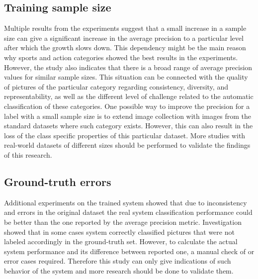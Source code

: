 \subsection{Training sample size}
Multiple results from the experiments suggest that a small increase in a sample size can give a significant increase in the average precision to a particular level after which the growth slows down. This dependency might be the main reason why sports and action categories showed the best results in the experiments. However, the study also indicates that there is a broad range of average precision values for similar sample sizes. This situation can be connected with the quality of pictures of the particular category regarding consistency, diversity, and representability, as well as the different level of challenge related to the automatic classification of these categories. One possible way to improve the precision for a label with a small sample size is to extend image collection with images from the standard datasets where such category exists. However, this can also result in the loss of the class specific properties of this particular dataset. More studies with real-world datasets of different sizes should be performed to validate the findings of this research.


\subsection{Ground-truth errors}
Additional experiments on the trained system showed that due to inconsistency and errors in the original dataset the real system classification performance could be better than the one reported by the average precision metric. Investigation showed that in some cases system correctly classified pictures that were not labeled accordingly in the ground-truth set. However, to calculate the actual system performance and its difference between reported one, a manual check of or error cases required. Therefore this study can only give indications of such behavior of the system and more research should be done to validate them.

